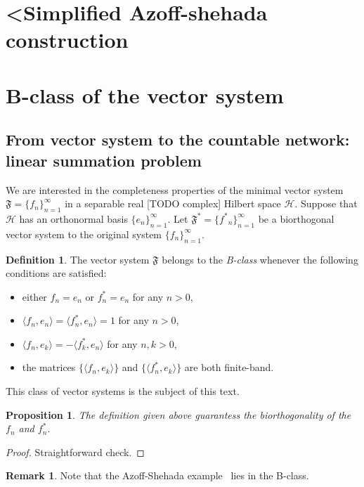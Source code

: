 \documentclass[12pt]{article}
\newcommand\inner[2]{\langle #1, #2 \rangle}
\renewcommand{\cal}[1]{\mathcal{#1}}
\newtheorem{prop}{Proposition}
\theoremstyle{definition}
\newtheorem{remark}{Remark}
\newtheorem{definition}{Definition}
\newcommand{\seq}[1]{\{{#1}_n\}_{n=1}^\infty}
\newcommand{\fsys}{\mathfrak{F}}
\newcommand{\fstarsys}{\mathfrak{F^{*}}}
\numberwithin{remark}{section}
\numberwithin{theorem}{section}
\numberwithin{prop}{section}
\numberwithin{equation}{section}
\numberwithin{lemma}{section}
\numberwithin{prop_under_lemma}{lemma}
\begin{document}


\section{<Simplified Azoff-shehada construction}
\section{B-class of the vector system}
  \subsection{From vector system to the countable network: linear summation problem}
    We are interested in the completeness properties of the minimal vector system $\fsys = \seq{f}$
      in a separable real [TODO complex] Hilbert space $\cal{H}$.
    Suppose that $\cal{H}$ has an orthonormal basis $\seq{e}$.
    Let $\fstarsys = \seq{f^*}$ be a biorthogonal vector system to the original system $\seq{f}$.
    \begin{definition}
        The vector system $\fsys$ belongs to the \textit{B-class} whenever the following conditions are satisfied:
        \begin{itemize}
            \item either $f_n = e_n$ or $f^*_n = e_n$ for any $n > 0$,
            \item $\inner{f_n}{e_n} = \inner{f^*_n}{e_n} = 1$ for any $n > 0$,
            \item $\inner{f_n}{e_k} = -\inner{f^*_k}{e_n}$ for any $n, k > 0$,
            \item the matrices $\{\inner{f_n}{e_k}\}$ and $\{\inner{f^*_n}{e_k}\}$ are both finite-band.
        \end{itemize}
    \end{definition}
    This class of vector systems is the subject of this text.
    \begin{prop}
        The definition given above guarantess the biorthogonality of the $f_n$ and $f^*_n$.
    \end{prop}
    \begin{proof}
        Straightforward check.
    \end{proof}
    \begin{remark}
        Note that the Azoff-Shehada example~\cite{azoff} lies in the B-class.
    \end{remark}
    
\end{document}
